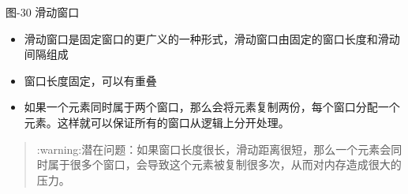 图-30 滑动窗口

\begin{itemize}
\tightlist
\item
  滑动窗口是固定窗口的更广义的一种形式，滑动窗口由固定的窗口长度和滑动间隔组成
\item
  窗口长度固定，可以有重叠
\item
  如果一个元素同时属于两个窗口，那么会将元素复制两份，每个窗口分配一个元素。这样就可以保证{所有的窗口从逻辑上分开处理}。
\end{itemize}

\begin{quote}
:warning:潜在问题：如果窗口长度很长，滑动距离很短，那么一个元素会同时属于很多个窗口，会导致这个元素被复制很多次，从而对内存造成很大的压力。
\end{quote}

\begin{Shaded}
\begin{Highlighting}[]
\NormalTok{\{}
    \OperatorTok{:}
\NormalTok{        (}\OperatorTok{,}\NormalTok{)}\OperatorTok{:}\NormalTok{ [}\NormalTok{(}\NormalTok{)]}\OperatorTok{,}
\NormalTok{        (}\OperatorTok{,}\NormalTok{)}\OperatorTok{:}\NormalTok{ [}\NormalTok{(}\NormalTok{)]}\OperatorTok{,}
\NormalTok{        (}\OperatorTok{,}\NormalTok{)}\OperatorTok{:}\NormalTok{ [}\NormalTok{]}\OperatorTok{,}
\NormalTok{    \}}\OperatorTok{,}
    \OperatorTok{:}
\NormalTok{        (}\OperatorTok{,}\NormalTok{)}\OperatorTok{:}\NormalTok{ [}\NormalTok{(}\NormalTok{)]}\OperatorTok{,}
\NormalTok{        (}\OperatorTok{,}\NormalTok{)}\OperatorTok{:}\NormalTok{ [}\NormalTok{(}\NormalTok{)]}\OperatorTok{,}
\NormalTok{        (}\OperatorTok{,}\NormalTok{)}\OperatorTok{:}\NormalTok{ [}\NormalTok{]}\OperatorTok{,}
\NormalTok{    \}}\OperatorTok{,}
\NormalTok{\}}
\end{Highlighting}
\end{Shaded}

